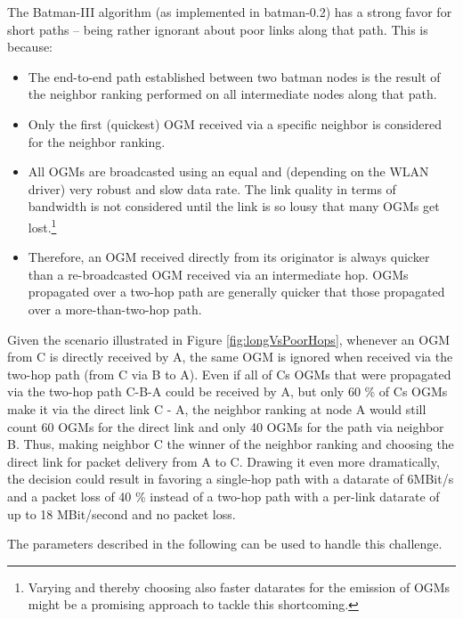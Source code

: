 \documentclass[11pt]{article}
\begin{document}
The Batman-III algorithm (as implemented in batman-0.2) has a strong favor for short paths -- being rather ignorant about poor links along that path.
%
This is because:
\begin{itemize}

 \item The end-to-end path established between two batman nodes is the result of the neighbor ranking performed on all intermediate nodes along that path.

 \item Only the first (quickest) OGM received via a specific neighbor is considered for the neighbor ranking. %

 \item All OGMs are broadcasted using an equal and (depending on the WLAN driver) very robust and slow data rate. The link quality in terms of bandwidth is not considered until the link is so lousy that many OGMs get lost.\footnote{Varying and thereby choosing also faster datarates for the emission of OGMs might be a promising approach to tackle this shortcoming.}

 \item Therefore, an OGM received directly from its originator is always quicker than a re-broadcasted OGM received via an intermediate hop. OGMs propagated over a two-hop path are generally quicker that those propagated over a more-than-two-hop path.


\end{itemize}

%
Given the scenario illustrated in Figure \ref{fig:longVsPoorHops},
whenever an OGM from C is directly received by A, the same OGM is ignored when received via the two-hop path (from C via B to A).
%
Even if all of Cs OGMs that were propagated via the two-hop path C-B-A could be received by A,
 but only 60 \% of Cs OGMs make it via the direct link C - A, the neighbor ranking at node A would still count 60 OGMs for the direct link and only 40 OGMs for the path via neighbor B. Thus, making neighbor C the winner of the neighbor ranking and choosing the direct link for packet delivery from A to C.
%
Drawing it even more dramatically, the decision could result in favoring a single-hop path with a datarate of 6MBit/s and a packet loss of 40 \% instead of a two-hop path with a per-link datarate of up to 18 MBit/second and no packet loss.



The parameters described in the following can be used to handle this challenge.
\end{document}
